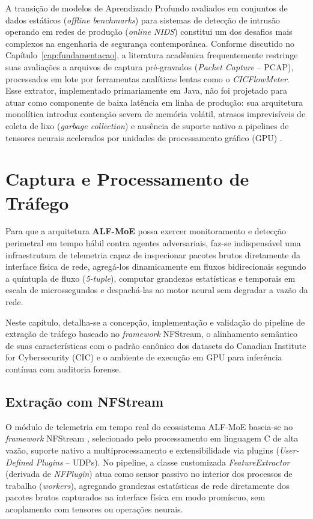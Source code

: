 A transição de modelos de Aprendizado Profundo avaliados em conjuntos de dados estáticos (\emph{offline benchmarks}) 
para sistemas de detecção de intrusão operando em redes de produção (\emph{online NIDS}) constitui um dos desafios mais 
complexos na engenharia de segurança contemporânea. Conforme discutido no Capítulo~\ref{cap:fundamentacao}, a literatura
acadêmica frequentemente restringe suas avaliações a arquivos de captura pré-gravados (\emph{Packet Capture} -- PCAP), 
processados em lote por ferramentas analíticas lentas como o \emph{CICFlowMeter}. Esse extrator, implementado 
primariamente em Java, não foi projetado para atuar como componente de baixa latência em linha de produção: sua 
arquitetura monolítica introduz contenção severa de memória volátil, atrasos imprevisíveis de coleta de lixo 
(\emph{garbage collection}) e ausência de suporte nativo a pipelines de tensores neurais acelerados por unidades de 
processamento gráfico (GPU) \cite{AOUINI2022108719}.

\section{Captura e Processamento de Tráfego}
\label{sec:captura_processamento}

Para que a arquitetura \textbf{ALF-MoE} possa exercer monitoramento e detecção perimetral em tempo hábil contra agentes 
adversariais, faz-se indispensável uma infraestrutura de telemetria capaz de inspecionar pacotes brutos diretamente da 
interface física de rede, agregá-los dinamicamente em fluxos bidirecionais segundo a quíntupla de fluxo
(\emph{5-tuple}), computar grandezas estatísticas e temporais em escala de microssegundos e despachá-las ao motor
neural sem degradar a vazão da rede. 

Neste capítulo, detalha-se a concepção, implementação e validação do pipeline de extração de tráfego baseado no 
\emph{framework} NFStream, o alinhamento semântico de suas características com o padrão canônico dos datasets do 
Canadian Institute for Cybersecurity (CIC) e o ambiente de execução em GPU para inferência contínua com auditoria 
forense.

\subsection{Extração com NFStream}
\label{subsec:extracao_nfstream}

O módulo de telemetria em tempo real do ecossistema ALF-MoE baseia-se no \emph{framework} NFStream
\cite{AOUINI2022108719}, selecionado pelo processamento em linguagem C de alta vazão, suporte nativo a
multiprocessamento e extensibilidade via plugins (\emph{User-Defined Plugins} -- UDPs). No pipeline, a classe
customizada \emph{FeatureExtractor} (derivada de \emph{NFPlugin}) atua como sensor passivo no interior dos processos de
trabalho (\emph{workers}), agregando grandezas estatísticas de rede diretamente dos pacotes brutos capturados na
interface física em modo promíscuo, sem acoplamento com tensores ou operações neurais.

